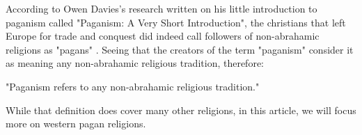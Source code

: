 According to Owen Davies's research written on his little introduction to paganism called "Paganism:
A Very Short Introduction", the christians that left Europe for trade and conquest did indeed call
followers of non-abrahamic religions as "pagans" \cite{Davies2011}. Seeing that the creators of the term
"paganism" consider it as meaning any non-abrahamic religious tradition, therefore:

\begin{center}
    \itshape
    \parbox{0.7\textwidth}{
    "Paganism refers to any non-abrahamic religious tradition."
    }
\end{center}

While that definition does cover many other religions, in this article, we will focus more on western
pagan religions.